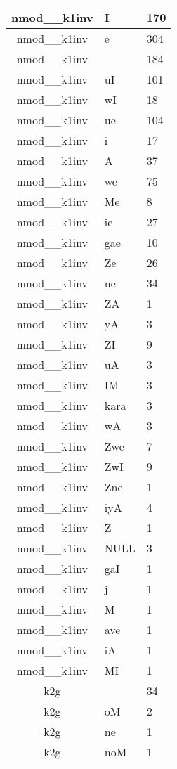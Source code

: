 \documentclass[a4 paper]{article}
\begin{document}
\begin{longtable}{cp{}p{}}
nmod\_\_k1inv & I & 170\\ \midrule nmod\_\_k1inv & e & 304\\ \midrule nmod\_\_k1inv &  & 184\\ \midrule nmod\_\_k1inv & uI & 101\\ \midrule nmod\_\_k1inv & wI & 18\\ \midrule nmod\_\_k1inv & ue & 104\\ \midrule nmod\_\_k1inv & i & 17\\ \midrule nmod\_\_k1inv & A & 37\\ \midrule nmod\_\_k1inv & we & 75\\ \midrule nmod\_\_k1inv & Me & 8\\ \midrule nmod\_\_k1inv & ie & 27\\ \midrule nmod\_\_k1inv & gae & 10\\ \midrule nmod\_\_k1inv & Ze & 26\\ \midrule nmod\_\_k1inv & ne & 34\\ \midrule nmod\_\_k1inv & ZA & 1\\ \midrule nmod\_\_k1inv & yA & 3\\ \midrule nmod\_\_k1inv & ZI & 9\\ \midrule nmod\_\_k1inv & uA & 3\\ \midrule nmod\_\_k1inv & IM & 3\\ \midrule nmod\_\_k1inv & kara & 3\\ \midrule nmod\_\_k1inv & wA & 3\\ \midrule nmod\_\_k1inv & Zwe & 7\\ \midrule nmod\_\_k1inv & ZwI & 9\\ \midrule nmod\_\_k1inv & Zne & 1\\ \midrule nmod\_\_k1inv & iyA & 4\\ \midrule nmod\_\_k1inv & Z & 1\\ \midrule nmod\_\_k1inv & NULL & 3\\ \midrule nmod\_\_k1inv & gaI & 1\\ \midrule nmod\_\_k1inv & j & 1\\ \midrule nmod\_\_k1inv & M & 1\\ \midrule nmod\_\_k1inv & ave & 1\\ \midrule nmod\_\_k1inv & iA & 1\\ \midrule nmod\_\_k1inv & MI & 1\\ \midrule 
k2g &  & 34\\ \midrule k2g & oM & 2\\ \midrule k2g & ne & 1\\ \midrule k2g & noM & 1\\ \midrule 

\end{longtable}
\end{document}
